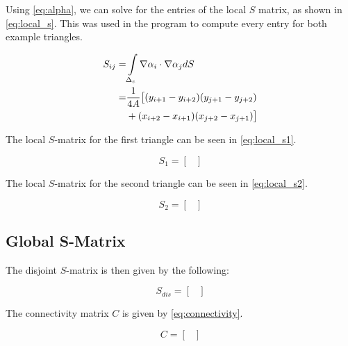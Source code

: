 \documentclass[a4paper,titlepage]{article}
\begin{document}
	Using \cref{eq:alpha}, we can solve for the entries of the local $S$ matrix, as shown in \cref{eq:local_s}. This was used in the program to compute every entry for both example triangles.
	
	\begin{equation} \label{eq:local_s}
		\begin{split}
			S_{ij} 
			= &\int\displaylimits_{\Delta_e}\nabla\alpha_i\cdot\nabla\alpha_j dS \\
			= &\frac{1}{4A} \big[ (y_{i+1} - y_{i+2})(y_{j+1} - y_{j+2}) \\
			&+ (x_{i+2} - x_{i+1})(x_{j+2} - x_{j+1})
			\big]
		\end{split}
	\end{equation}
	
	The local $S$-matrix for the first triangle can be seen in \cref{eq:local_s1}.
	
	\begin{equation} \label{eq:local_s1}
		S_1 =
			\begin{bmatrix}
				
			\end{bmatrix}
	\end{equation}
	
	The local $S$-matrix for the second triangle can be seen in \cref{eq:local_s2}.
	
	\begin{equation} \label{eq:local_s2}
		S_2 =
			\begin{bmatrix}
				
			\end{bmatrix}
	\end{equation}
	
	\subsection{Global S-Matrix}
	
	The disjoint $S$-matrix is then given by the following:

	\begin{equation*}
		S_{dis} =
			\begin{bmatrix}
				
			\end{bmatrix}
	\end{equation*}
	
	The connectivity matrix $C$ is given by \cref{eq:connectivity}.

	\begin{equation} \label{eq:connectivity}
		C =
			\begin{bmatrix}
				
			\end{bmatrix}
	\end{equation}
	
\end{document}

